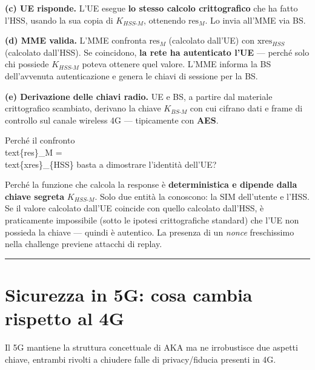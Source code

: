 \documentclass[
  italian,
  openany]{book}
\begin{document}
\textbf{(c) UE risponde.} L'UE esegue \textbf{lo stesso calcolo
crittografico} che ha fatto l'HSS, usando la sua copia di
\(K_{HSS\text{-}M}\), ottenendo \(\text{res}_{M}\). Lo invia all'MME via
BS.

\textbf{(d) MME valida.} L'MME confronta \(\text{res}_{M}\) (calcolato
dall'UE) con \(\text{xres}_{HSS}\) (calcolato dall'HSS). Se coincidono,
\textbf{la rete ha autenticato l'UE} --- perché solo chi possiede
\(K_{HSS\text{-}M}\) poteva ottenere quel valore. L'MME informa la BS
dell'avvenuta autenticazione e genera le chiavi di sessione per la BS.

\textbf{(e) Derivazione delle chiavi radio.} UE e BS, a partire dal
materiale crittografico scambiato, derivano la chiave
\(K_{BS\text{-}M}\) con cui cifrano dati e frame di controllo sul canale
wireless 4G --- tipicamente con \textbf{AES}.

\begin{calloutquestion}{Perché il confronto \\text\{res\}\_M = \\text\{xres\}\_\{HSS\} basta a dimostrare l’identità dell’UE?}

Perché la funzione che calcola la response è \textbf{deterministica e
dipende dalla chiave segreta} \(K_{HSS\text{-}M}\). Solo due entità la
conoscono: la SIM dell'utente e l'HSS. Se il valore calcolato dall'UE
coincide con quello calcolato dall'HSS, è praticamente impossibile
(sotto le ipotesi crittografiche standard) che l'UE non possieda la
chiave --- quindi è autentico. La presenza di un \emph{nonce}
freschissimo nella challenge previene attacchi di replay.

\end{calloutquestion}

\begin{center}\rule{0.5\linewidth}{0.5pt}\end{center}

\section{Sicurezza in 5G: cosa cambia rispetto al
4G}\label{sicurezza-in-5g-cosa-cambia-rispetto-al-4g}

Il 5G mantiene la struttura concettuale di AKA ma ne irrobustisce due
aspetti chiave, entrambi rivolti a chiudere falle di privacy/fiducia
presenti in 4G.
\end{document}
